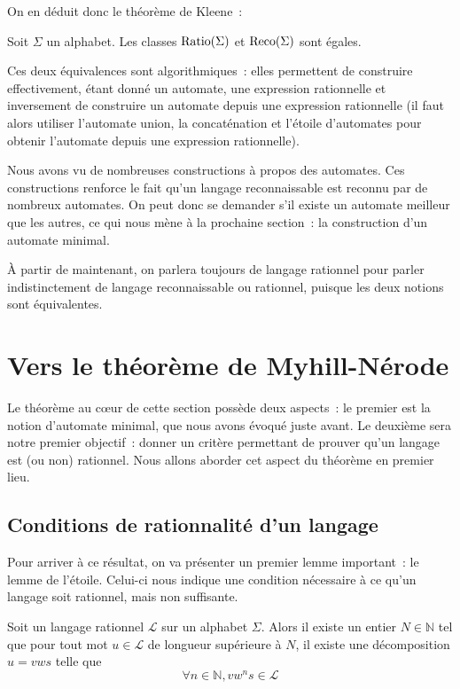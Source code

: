 On en déduit donc le théorème de Kleene~:

\begin{theorem}[Kleene]
  Soit $\Sigma$ un alphabet. Les classes $\operatorname{Ratio}(\Sigma)$ et $\operatorname{Reco}(\Sigma)$
  sont égales.
\end{theorem}

\begin{remark}
  Ces deux équivalences sont algorithmiques~: elles permettent de construire
  effectivement, étant donné un automate, une expression rationnelle et
  inversement de construire un automate depuis une expression rationnelle (il
  faut alors utiliser l'automate union, la concaténation et l'étoile
  d'automates pour obtenir l'automate depuis une expression rationnelle).
\end{remark}

Nous avons vu de nombreuses constructions à propos des automates. Ces
constructions renforce le fait qu'un langage reconnaissable est reconnu par de
nombreux automates. On peut donc se demander s'il existe un automate meilleur
que les autres, ce qui nous mène à la prochaine section~: la construction d'un
automate minimal.

\`A partir de maintenant, on parlera toujours de langage rationnel pour parler
indistinctement de langage reconnaissable ou rationnel, puisque les deux notions
sont équivalentes.

\section{Vers le théorème de Myhill-Nérode}

Le théorème au c\oe ur de cette section possède deux aspects~: le premier est
la notion d'automate minimal, que nous avons évoqué juste avant. Le deuxième
sera notre premier objectif~: donner un critère permettant de prouver qu'un
langage est (ou non) rationnel. Nous allons aborder cet aspect du théorème en
premier lieu.

\subsection{Conditions de rationnalité d'un langage}

Pour arriver à ce résultat, on va présenter un premier lemme important~: le
lemme de l'étoile. Celui-ci nous indique une condition nécessaire à ce qu'un
langage soit rationnel, mais non suffisante.

\begin{lemma}[de l'étoile]
  Soit un langage rationnel $\mathcal L$ sur un alphabet $\Sigma$. Alors il
  existe un entier $N \in \mathbb N$ tel que pour tout mot $u\in\mathcal L$ de
  longueur supérieure à $N$, il existe une décomposition $u = vws$ telle que
  \[\forall n \in \mathbb N, vw^ns \in \mathcal L\]
\end{lemma}

